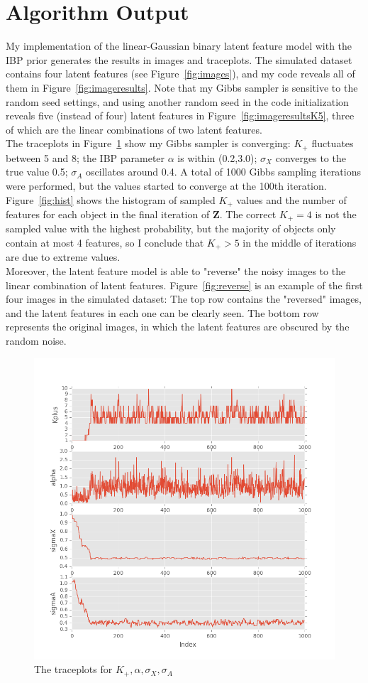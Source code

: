 \section{Algorithm Output}
My implementation of the linear-Gaussian binary latent feature model with the IBP prior generates the results in images and traceplots. The simulated dataset contains four latent features (see Figure~\ref{fig:images}), and my code reveals all of them in Figure~\ref{fig:imageresults}. Note that my Gibbs sampler is sensitive to the random seed settings, and using another random seed in the code initialization reveals five (instead of four) latent features in Figure~\ref{fig:imageresultsK5}, three of which are the linear combinations of two latent features.\\ 

The traceplots in Figure~\ref{fig:plotresults} show my Gibbs sampler is converging: $K_+$ fluctuates between 5 and 8; the IBP parameter $\alpha$ is within (0.2,3.0); $\sigma_X$ converges to the true value 0.5; $\sigma_A$ oscillates around 0.4. A total of 1000 Gibbs sampling iterations were performed, but the values started to converge at the 100th iteration. Figure~\ref{fig:hist} shows the histogram of sampled $K_+$ values and the number of features for each object in the final iteration of $\mathbf{Z}$. The correct $K_+ = 4$ is not the sampled value with the highest probability, but the majority of objects only contain at most 4 features, so I conclude that $K_+ > 5$ in the middle of iterations are due to extreme values. \\

Moreover, the latent feature model is able to "reverse" the noisy images to the linear combination of latent features. Figure~\ref{fig:reverse} is an example of the first four images in the simulated dataset: The top row contains the "reversed" images, and the latent features in each one can be clearly seen. The bottom row represents the original images, in which the latent features are obscured by the random noise. 

\begin{figure}[!ht]
\centering
    \includegraphics[width=0.65\linewidth]{Version1_Naive_Code/IBP_plot_results.png}
    \vspace{-20pt}
    \caption{The traceplots for $K_+, \alpha, \sigma_X, \sigma_A$}
    \label{fig:plotresults}
\end{figure}

